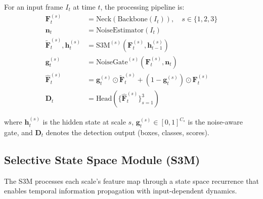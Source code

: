 \documentclass[review]{eccv2026}
\begin{document}
For an input frame $I_t$ at time $t$, the processing pipeline is:
\begin{align}
  \bm{F}_t^{(s)} &= \text{Neck}(\text{Backbone}(I_t)), \quad s \in \{1,2,3\} \label{eq:backbone} \\
  \bm{n}_t &= \text{NoiseEstimator}(I_t) \label{eq:noise} \\
  \tilde{\bm{F}}_t^{(s)}, \bm{h}_t^{(s)} &= \text{S3M}^{(s)}(\bm{F}_t^{(s)}, \bm{h}_{t-1}^{(s)}) \label{eq:ssm} \\
  \bm{g}_t^{(s)} &= \text{NoiseGate}^{(s)}(\bm{F}_t^{(s)}, \bm{n}_t) \label{eq:gate} \\
  \hat{\bm{F}}_t^{(s)} &= \bm{g}_t^{(s)} \odot \tilde{\bm{F}}_t^{(s)} + (1 - \bm{g}_t^{(s)}) \odot \bm{F}_t^{(s)} \label{eq:blend} \\
  \bm{D}_t &= \text{Head}(\{\hat{\bm{F}}_t^{(s)}\}_{s=1}^{3}) \label{eq:head}
\end{align}

\noindent
where $\bm{h}_t^{(s)}$ is the hidden state at scale $s$, $\bm{g}_t^{(s)} \in [0,1]^{C_s}$ is the noise-aware gate, and $\bm{D}_t$ denotes the detection output (boxes, classes, scores).


\subsection{Selective State Space Module (S3M)}
\label{sec:ssm}

The S3M processes each scale's feature map through a state space recurrence that enables temporal information propagation with input-dependent dynamics.
\end{document}
